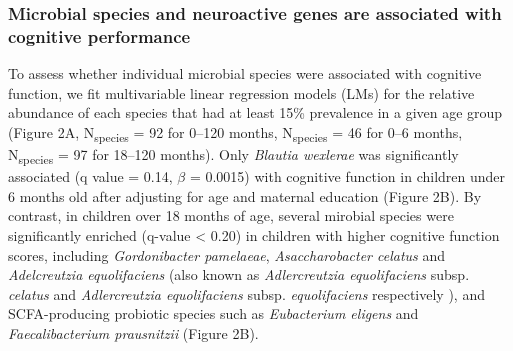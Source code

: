 \documentclass{article}
\begin{document}
\subsubsection*{Microbial species and neuroactive genes are associated with cognitive performance}

To assess whether individual microbial species were associated with
cognitive function, we fit multivariable linear regression models (LMs)
\cite{mallickMultivariableAssociationDiscovery2021}
for the relative abundance of each species that had at least 15\%
prevalence in a given age group (Figure 2A, N\textsubscript{species} = 92 for 0--120 months, 
N\textsubscript{species} = 46 for 0--6 months, N\textsubscript{species} = 97 for 18--120 months).
Only \emph{Blautia wexlerae} was significantly associated (q value = 0.14, $\beta$ = 0.0015) with
cognitive function in children under 6 months old after adjusting for
age and maternal education (Figure 2B).
By contrast, in children over 18 months of age,
several mirobial species were significantly enriched (q-value
\textless{} 0.20) in children with higher cognitive function scores,
including \emph{Gordonibacter pamelaeae},
\emph{Asaccharobacter celatus} and \emph{Adelcreutzia equolifaciens}
(also known as \textit{Adlercreutzia equolifaciens} subsp. \textit{celatus}
and \textit{Adlercreutzia equolifaciens} subsp. \textit{equolifaciens} respectively
\cite{maruoAdlercreutziaEquolifaciensGen2008}),
and SCFA-producing probiotic
species such as \emph{Eubacterium eligens} and \emph{Faecalibacterium
prausnitzii}
\cite{ghoshMediterraneanDietIntervention2020}
(Figure 2B).
\end{document}
